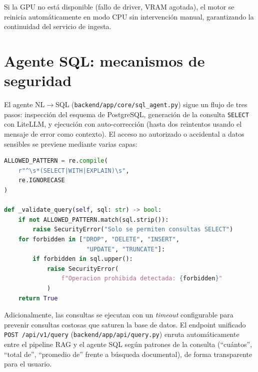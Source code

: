 Si la GPU no está disponible (fallo de driver, VRAM agotada), el motor se reinicia automáticamente en modo CPU sin intervención manual, garantizando la continuidad del servicio de ingesta.

\section{Agente SQL: mecanismos de seguridad}
\label{anexo:sql-agent}

El agente NL$\rightarrow$SQL (\texttt{backend/app/core/sql\_agent.py}) sigue un flujo de tres pasos: inspección del esquema de PostgreSQL, generación de la consulta \texttt{SELECT} con LiteLLM, y ejecución con auto-corrección (hasta dos reintentos usando el mensaje de error como contexto). El acceso no autorizado o accidental a datos sensibles se previene mediante varias capas:

\begin{lstlisting}[language=Python, caption={Validación de la consulta generada contra lista blanca.}]
ALLOWED_PATTERN = re.compile(
    r"^\s*(SELECT|WITH|EXPLAIN)\s",
    re.IGNORECASE
)

def _validate_query(self, sql: str) -> bool:
    if not ALLOWED_PATTERN.match(sql.strip()):
        raise SecurityError("Solo se permiten consultas SELECT")
    for forbidden in ["DROP", "DELETE", "INSERT",
                       "UPDATE", "TRUNCATE"]:
        if forbidden in sql.upper():
            raise SecurityError(
                f"Operacion prohibida detectada: {forbidden}"
            )
    return True
\end{lstlisting}

Adicionalmente, las consultas se ejecutan con un \textit{timeout} configurable para prevenir consultas costosas que saturen la base de datos. El endpoint unificado \texttt{POST /api/v1/query} (\texttt{backend/app/api/query.py}) enruta automáticamente entre el pipeline RAG y el agente SQL según patrones de la consulta (``cuántos'', ``total de'', ``promedio de'' frente a búsqueda documental), de forma transparente para el usuario.
